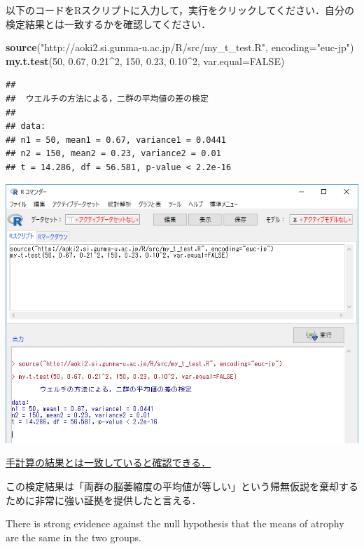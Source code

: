 \documentclass[11pt,]{problemset}
\newenvironment{Shaded}{\begin{snugshade}}{\end{snugshade}}
\newcommand{\DataTypeTok}[1]{\textcolor[rgb]{0.13,0.29,0.53}{#1}}
\newcommand{\DecValTok}[1]{\textcolor[rgb]{0.00,0.00,0.81}{#1}}
\newcommand{\FloatTok}[1]{\textcolor[rgb]{0.00,0.00,0.81}{#1}}
\newcommand{\KeywordTok}[1]{\textcolor[rgb]{0.13,0.29,0.53}{\textbf{#1}}}
\newcommand{\NormalTok}[1]{#1}
\newcommand{\OperatorTok}[1]{\textcolor[rgb]{0.81,0.36,0.00}{\textbf{#1}}}
\newcommand{\OtherTok}[1]{\textcolor[rgb]{0.56,0.35,0.01}{#1}}
\newcommand{\StringTok}[1]{\textcolor[rgb]{0.31,0.60,0.02}{#1}}
\begin{document}
以下のコードをRスクリプトに入力して，実行をクリックしてください．自分の検定結果とは一致するかを確認してください．

\begin{Shaded}
\begin{Highlighting}[]
\KeywordTok{source}\NormalTok{(}\StringTok{"http://aoki2.si.gunma-u.ac.jp/R/src/my_t_test.R"}\NormalTok{, }\DataTypeTok{encoding=}\StringTok{"euc-jp"}\NormalTok{)}
\KeywordTok{my.t.test}\NormalTok{(}\DecValTok{50}\NormalTok{, }\FloatTok{0.67}\NormalTok{, }\FloatTok{0.21}\OperatorTok{^}\DecValTok{2}\NormalTok{, }\DecValTok{150}\NormalTok{, }\FloatTok{0.23}\NormalTok{, }\FloatTok{0.10}\OperatorTok{^}\DecValTok{2}\NormalTok{, }\DataTypeTok{var.equal=}\OtherTok{FALSE}\NormalTok{)}
\end{Highlighting}
\end{Shaded}

\begin{verbatim}
## 
##  ウエルチの方法による，二群の平均値の差の検定
## 
## data:  
## n1 = 50, mean1 = 0.67, variance1 = 0.0441
## n2 = 150, mean2 = 0.23, variance2 = 0.01
## t = 14.286, df = 56.581, p-value < 2.2e-16
\end{verbatim}

\begin{center}\includegraphics[width=0.9\linewidth]{pic/myttest02} \end{center}
\bigskip

\underline{手計算の結果とは一致していると確認できる．}

この検定結果は「両群の脳萎縮度の平均値が等しい」という帰無仮説を棄却するために非常に強い証拠を提供したと言える．

There is strong evidence against the null hypothesis that the means of
atrophy are the same in the two groups.
\end{document}
